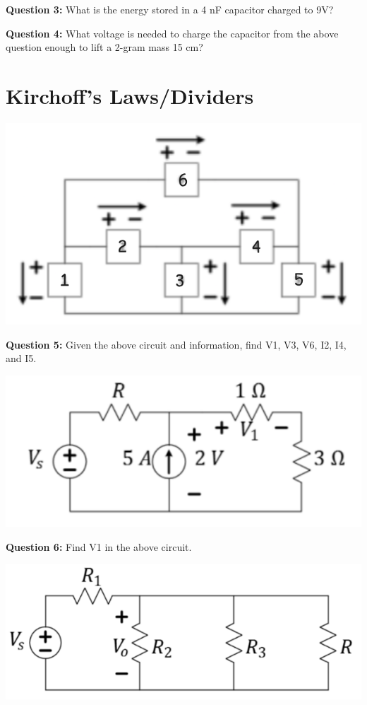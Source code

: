 \documentclass{article}
\begin{document}
\textbf{Question 3:} What is the energy stored in a 4 nF capacitor charged to 9V?

\textbf{Question 4:} What voltage is needed to charge the capacitor from the above question enough to lift a 2-gram mass 15 cm?

\section*{Kirchoff's Laws/Dividers}

\begin{center}
    \includegraphics[width=0.75\linewidth]{figures/2.png}
\end{center}

\textbf{Question 5:} Given the above circuit and information, find V1, V3, V6, I2, I4, and I5.

\begin{center}
    \includegraphics[width=0.75\linewidth]{figures/3.png}
\end{center}

\textbf{Question 6:} Find V1 in the above circuit.

\begin{center}

    \includegraphics[width=0.75\linewidth]{figures/5.png}

\end{center}
\end{document}
